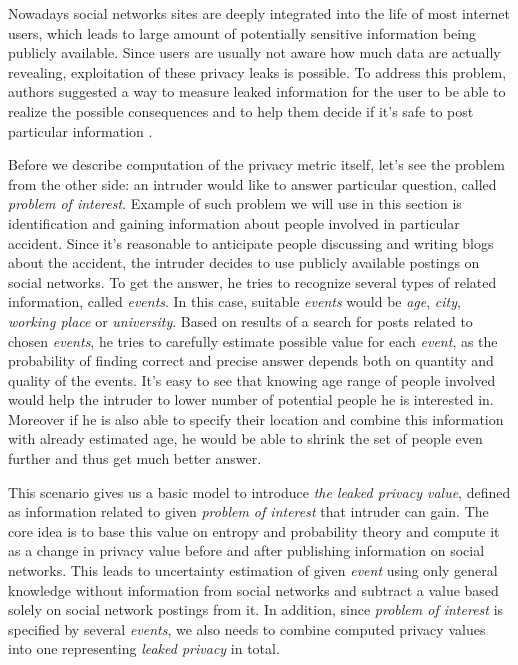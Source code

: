 \documentclass[a4paper]{article}
\begin{document}
Nowadays social networks sites are deeply integrated into the life of
most internet users, which leads to large amount of potentially
sensitive information being publicly available. Since users are usually
not aware how much data are actually revealing, exploitation of these
privacy leaks is possible. To address this problem, authors suggested a
way to measure leaked information for the user to be able to realize the
possible consequences and to help them decide if it's safe to post
particular information \cite{paper_privacy_sns}.

Before we describe computation of the privacy metric itself, let's see
the problem from the other side: an intruder would like to answer
particular question, called \emph{problem of interest}. Example of such
problem we will use in this section is identification and gaining
information about people involved in particular accident. Since it's
reasonable to anticipate people discussing and writing blogs about the
accident, the intruder decides to use publicly available postings on social
networks. To get the answer, he tries to recognize several
types of related information, called \emph{events}. In this case,
suitable \emph{events} would be \emph{age}, \emph{city}, \emph{working
place} or \emph{university}. Based on results of a search for posts
related to chosen \emph{events}, he tries to carefully estimate possible
value for each \emph{event}, as the probability of finding correct and
precise answer depends both on quantity and quality of the events. It's
easy to see that knowing age range of people involved would help the
intruder to lower number of potential people he is interested in.
Moreover if he is also able to specify their location and combine this
information with already estimated age, he would be able to shrink the
set of people even further and thus get much better answer.

This scenario gives us a basic model to introduce \emph{the leaked
privacy value}, defined as information related to given \emph{problem of
interest} that intruder can gain. The core idea is to base this value on
entropy and probability theory and compute it as a change in privacy
value before and after publishing information on social networks. This
leads to uncertainty estimation of given \emph{event} using only general
knowledge without information from social networks and subtract a
value based solely on social network postings from it. In addition, since
\emph{problem of interest} is specified by several \emph{events}, we
also needs to combine computed privacy values into one representing
\emph{leaked privacy} in total.
\end{document}

